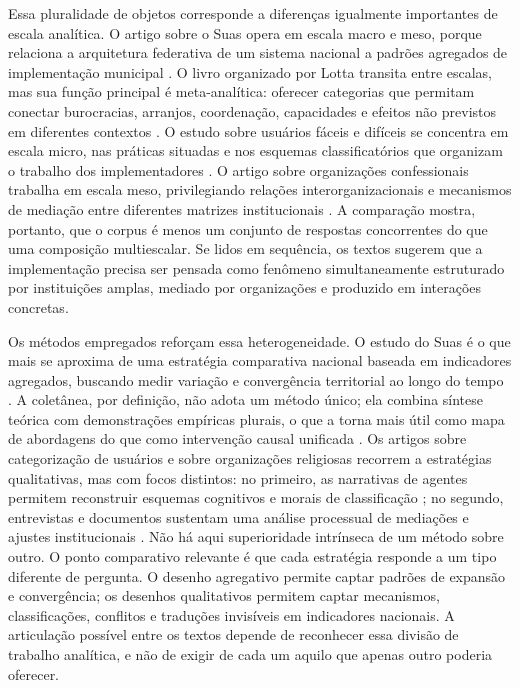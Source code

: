 \documentclass[12pt,a4paper]{article}
\begin{document}
Essa pluralidade de objetos corresponde a diferenças igualmente importantes de escala analítica. O artigo sobre o Suas opera em escala macro e meso, porque relaciona a arquitetura federativa de um sistema nacional a padrões agregados de implementação municipal \parencite{bichir2020_sistemas_nacionais}. O livro organizado por Lotta transita entre escalas, mas sua função principal é meta-analítica: oferecer categorias que permitam conectar burocracias, arranjos, coordenação, capacidades e efeitos não previstos em diferentes contextos \parencite{lotta2019_teorias_analises}. O estudo sobre usuários fáceis e difíceis se concentra em escala micro, nas práticas situadas e nos esquemas classificatórios que organizam o trabalho dos implementadores \parencite{lotta2020_categorizando_usuarios}. O artigo sobre organizações confessionais trabalha em escala meso, privilegiando relações interorganizacionais e mecanismos de mediação entre diferentes matrizes institucionais \parencite{lotta2023_jesus_speaks}. A comparação mostra, portanto, que o corpus é menos um conjunto de respostas concorrentes do que uma composição multiescalar. Se lidos em sequência, os textos sugerem que a implementação precisa ser pensada como fenômeno simultaneamente estruturado por instituições amplas, mediado por organizações e produzido em interações concretas.

Os métodos empregados reforçam essa heterogeneidade. O estudo do Suas é o que mais se aproxima de uma estratégia comparativa nacional baseada em indicadores agregados, buscando medir variação e convergência territorial ao longo do tempo \parencite{bichir2020_sistemas_nacionais}. A coletânea, por definição, não adota um método único; ela combina síntese teórica com demonstrações empíricas plurais, o que a torna mais útil como mapa de abordagens do que como intervenção causal unificada \parencite{lotta2019_teorias_analises}. Os artigos sobre categorização de usuários e sobre organizações religiosas recorrem a estratégias qualitativas, mas com focos distintos: no primeiro, as narrativas de agentes permitem reconstruir esquemas cognitivos e morais de classificação \parencite{lotta2020_categorizando_usuarios}; no segundo, entrevistas e documentos sustentam uma análise processual de mediações e ajustes institucionais \parencite{lotta2023_jesus_speaks}. Não há aqui superioridade intrínseca de um método sobre outro. O ponto comparativo relevante é que cada estratégia responde a um tipo diferente de pergunta. O desenho agregativo permite captar padrões de expansão e convergência; os desenhos qualitativos permitem captar mecanismos, classificações, conflitos e traduções invisíveis em indicadores nacionais. A articulação possível entre os textos depende de reconhecer essa divisão de trabalho analítica, e não de exigir de cada um aquilo que apenas outro poderia oferecer.
\end{document}
